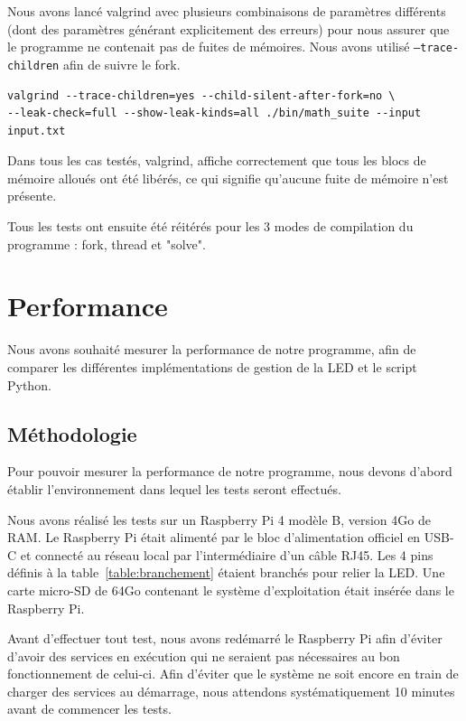 \documentclass[a4paper,11pt]{article}
\begin{document}
Nous avons lancé valgrind avec plusieurs combinaisons de paramètres différents (dont des paramètres générant explicitement des erreurs) pour nous assurer que le programme ne contenait pas de fuites de mémoires. Nous avons utilisé \texttt{--trace-children} afin de suivre le fork.

\begin{verbatim}
valgrind --trace-children=yes --child-silent-after-fork=no \
--leak-check=full --show-leak-kinds=all ./bin/math_suite --input input.txt
\end{verbatim}

Dans tous les cas testés, valgrind, affiche correctement que tous les blocs de mémoire alloués ont été libérés, ce qui signifie qu'aucune fuite de mémoire n'est présente.

Tous les tests ont ensuite été réitérés pour les 3 modes de compilation du programme : fork, thread et "solve".



\section{Performance}

Nous avons souhaité mesurer la performance de notre programme, afin de comparer les différentes implémentations de gestion de la LED et le script Python.

\subsection{Méthodologie}

Pour pouvoir mesurer la performance de notre programme, nous devons d'abord établir l’environnement dans lequel les tests seront effectués.

Nous avons réalisé les tests sur un Raspberry Pi 4 modèle B, version 4Go de RAM. Le Raspberry Pi était alimenté par le bloc d'alimentation officiel en USB-C et connecté au réseau local par l'intermédiaire d'un câble RJ45. Les 4 pins définis à la table~\ref{table:branchement} étaient branchés pour relier la LED. Une carte micro-SD de 64Go contenant le système d'exploitation était insérée dans le Raspberry Pi.
 
Avant d'effectuer tout test, nous avons redémarré le Raspberry Pi afin d'éviter d'avoir des services en exécution qui ne seraient pas nécessaires au bon fonctionnement de celui-ci. Afin d'éviter que le système ne soit encore en train de charger des services au démarrage, nous attendons systématiquement 10 minutes avant de commencer les tests.
\end{document}
